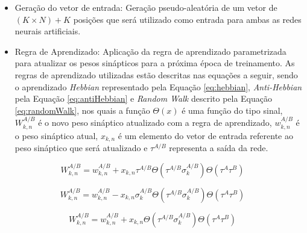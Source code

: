 \documentclass[12pt]{article}
\begin{document}
        \begin{itemize}
            
            \item Geração do vetor de entrada:
            Geração pseudo-aleatória de um vetor de $(K \times N) + K$ posições que será utilizado como entrada para ambas as redes neurais artificiais.
                
            \item Regra de Aprendizado:
            Aplicação da regra de aprendizado parametrizada para atualizar os pesos sinápticos para a próxima época de treinamento. As regras de aprendizado utilizadas estão descritas nas equações a seguir, sendo o aprendizado \textit{Hebbian} representado pela Equação \eqref{eq:hebbian}, \textit{Anti-Hebbian} pela Equação \eqref{eq:antiHebbian} e \textit{Random Walk} descrito pela Equação \eqref{eq:randomWalk}, nos quais a função \textit{$\Theta(x)$} é uma função do tipo sinal, $W^{A/B}_{k,n}$ é o novo peso sináptico atualizado com a regra de aprendizado, $w^{A/B}_{k,n}$ é o peso sináptico atual, $x_{k,n}$ é um elemento do vetor de entrada referente ao peso sináptico que será atualizado e $\tau^{A/B}$ representa a saída da rede.
            
        \end{itemize}
            
        \begin{equation}
            \label{eq:hebbian}
            W_{k,n}^{A/B} = w_{k,n}^{A/B} + x_{k,n} \tau^{A/B} \Theta(\tau^{A/B} \sigma_{k}^{A/B}) \Theta(\tau^{A} \tau^{B})
        \end{equation}
            
        \begin{equation}
            \label{eq:antiHebbian}
            W_{k,n}^{A/B} = w_{k,n}^{A/B} - x_{k,n} \sigma_{k}^{A/B} \Theta(\tau^{A/B} \sigma_{k}^{A/B}) \Theta(\tau^{A} \tau^{B})
        \end{equation}
            
        \begin{equation}
            \label{eq:randomWalk}
            W_{k,n}^{A/B} = w_{k,n}^{A/B} + x_{k,n} \Theta(\tau^{A/B} \sigma_{k}^{A/B}) \Theta(\tau^{A} \tau^{B})
        \end{equation}

        
\end{document}
